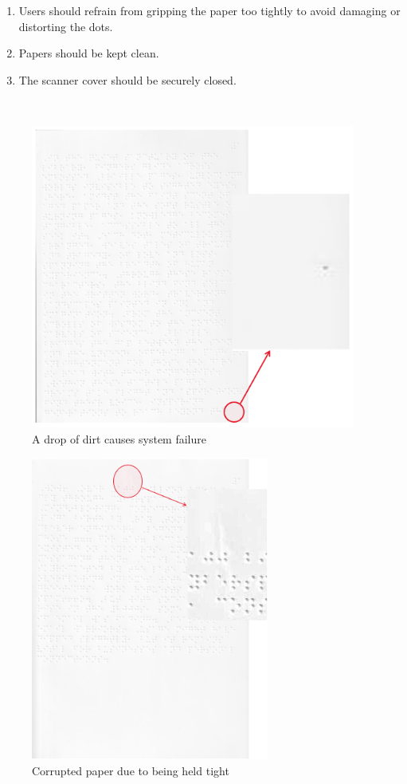 \begin{enumerate}
\def\labelenumi{\arabic{enumi}.}
\item
  Users should refrain from gripping the paper too tightly to avoid
  damaging or distorting the dots.
\item
  Papers should be kept clean.
\item
  The scanner cover should be securely closed.
\end{enumerate}\\
\begin{figure}[h!]
    \centering
    \includegraphics[width=.9\textwidth,height = 10cm]{A drop of dirt.png}
    \caption{A drop of dirt causes system failure}
    \label{fig:Clear real braille samples}
\end{figure}
\begin{figure}
    \centering
    \includegraphics[width=.8\textwidth,height = 10cm]{held tight.png}
    \caption{Corrupted paper due to being held tight}
    \label{fig:Clear real braille samples}
\end{figure}\\
